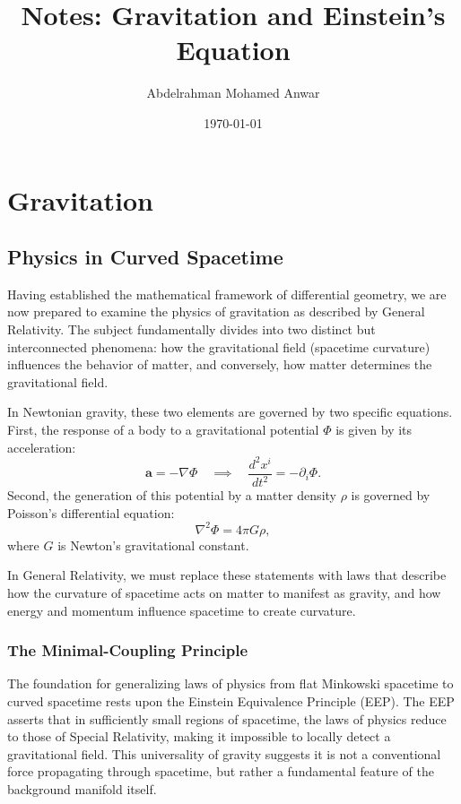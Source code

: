 \documentclass[11pt, a4paper]{report}
\title{Notes: Gravitation and Einstein's Equation}
\author{Abdelrahman Mohamed Anwar}
\date{\today}
\begin{document}
\maketitle
\tableofcontents
\newpage

\chapter{Gravitation}

\section{Physics in Curved Spacetime}

Having established the mathematical framework of differential geometry, we are now prepared to examine the physics of gravitation as described by General Relativity. The subject fundamentally divides into two distinct but interconnected phenomena: how the gravitational field (spacetime curvature) influences the behavior of matter, and conversely, how matter determines the gravitational field.

In Newtonian gravity, these two elements are governed by two specific equations. First, the response of a body to a gravitational potential $\Phi$ is given by its acceleration:
\begin{equation}
\label{eq:newton_accel}
\mathbf{a} = -\nabla\Phi \quad \implies \quad \frac{d^{2}x^{i}}{dt^{2}} = -\partial_{i}\Phi.
\end{equation}
Second, the generation of this potential by a matter density $\rho$ is governed by Poisson's differential equation:
\begin{equation}
\label{eq:poisson}
\nabla^{2}\Phi = 4\pi G\rho,
\end{equation}
where $G$ is Newton's gravitational constant. 

In General Relativity, we must replace these statements with laws that describe how the curvature of spacetime acts on matter to manifest as gravity, and how energy and momentum influence spacetime to create curvature.

\subsection*{The Minimal-Coupling Principle}
The foundation for generalizing laws of physics from flat Minkowski spacetime to curved spacetime rests upon the Einstein Equivalence Principle (EEP). The EEP asserts that in sufficiently small regions of spacetime, the laws of physics reduce to those of Special Relativity, making it impossible to locally detect a gravitational field. This universality of gravity suggests it is not a conventional force propagating through spacetime, but rather a fundamental feature of the background manifold itself.
\end{document}
